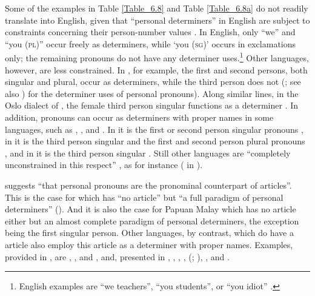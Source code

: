 Some of the examples in Table \ref{Table_6.8} and Table \ref{Table_6.8a} do not readily translate into English, given that “personal determiners” in English are subject to constraints concerning their person-number values \citep[27]{Lyons.1999}. In English, only ``we'' and ``you (\textsc{pl})'' occur freely as determiners, while ‘you (\textsc{sg})’ occurs in exclamations only; the remaining pronouns do not have any determiner uses.\footnote{English examples are ``we teachers'', ``you students'', or ``you idiot'' \citep[451–442]{Lyons.1999}.} Other languages, however, are less constrained. In , for example, the first and second persons, both singular and plural, occur as determiners, while the third person does not (\citealt[142]{Lyons.1999}; see also \citealt[189]{Helmbrecht.2004}) for the determiner uses of personal pronouns). Along similar lines, in the Oslo dialect of , the female third person singular  functions as a determiner \citep{Johannessen.2006}. In addition, pronouns can occur as determiners with proper names in some  languages, such as , , and . In  it is the first or second person singular pronouns \citep[264-269]{Roehr.2005}, in  it is the third person singular and the first and second person plural pronouns \citep[218-224]{Sigursson.2006}, and in  it is the third person singular  \citep[581]{Matushansky.2008}. Still other languages are “completely unconstrained in this respect” \citep[142]{Lyons.1999}, as for instance  (\citealt{Hale.1973} in \citealt[142]{Lyons.1999}).


\citet[134]{Lyons.1999} suggests “that personal pronouns are the pronominal counterpart of  articles”. This is the case for  which has “no  article” but “a full paradigm of personal determiners” (\citeyear*[142, 144]{Lyons.1999}). And it is also the case for Papuan Malay which has no  article either but an almost complete paradigm of personal determiners, the exception being the first singular person. Other  languages, by contrast, which do have a  article also employ this article as a determiner with proper names. Examples, provided in \citet{Campbell.2000}, are  \citep{Kersten.1948},  \citep{Topping.1960}, and  \citep{Milner.1959, Schutz.1971}, and, presented in \citet{Campbell.2000b},  \citep{Arakin.1963},  \citep{Krupa.1967},  \citep{Moussay.1981},  (\citealt{Bowen.1965}; \citealt{Ramos.1971}),  \citep{Arakin.1981}, and  \citep{Churchward.1953}.



